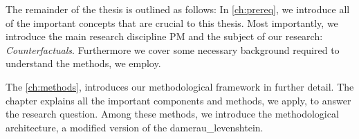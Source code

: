 \documentclass[./../../paper.tex]{subfiles}
\begin{document}
    The remainder of the thesis is outlined as follows: In \autoref{ch:prereq}, we introduce all of the important concepts that are crucial to this thesis. Most importantly, we introduce the main research discipline \Gls{PM} and the subject of our research: \emph{Counterfactuals}. Furthermore we cover some necessary background required to understand the methods, we employ.
    
    
    



    

    The \autoref{ch:methods}, introduces our methodological framework in further detail. The chapter explains all the important components and methods, we apply, to answer the research question. Among these methods, we introduce the methodological architecture, a modified version of the \Gls{damerau_levenshtein}.
\end{document}

